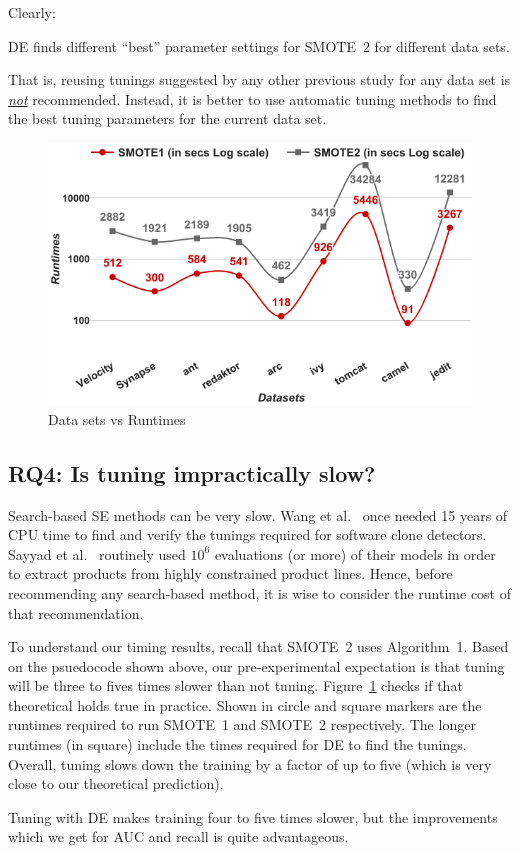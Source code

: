 Clearly:
\begin{lesson1}
    DE finds different ``best'' parameter settings for SMOTE~2 for different data sets.
\end{lesson1}
 That is,  reusing tunings  suggested  by  any other  previous study  for any data set is \underline{{\em not}} recommended. Instead,  it is better to
      use  automatic  tuning  methods  to find the best tuning parameters for the current data set.
      

\begin{figure}[!t]
  \captionsetup{justification=centering}
  \includegraphics[width=\linewidth]{./fig/runtimes.png}
  \caption{Data sets vs Runtimes}
  \label{runtime}
\end{figure} 

\subsection{\textbf{RQ4: Is tuning impractically slow?}}

Search-based SE methods can be very slow. Wang et al.~\cite{wang2013searching} once needed 15
years of CPU time to find and verify the tunings required for software
clone detectors. Sayyad et al.~\cite{sayyad2013scalable} routinely used
$10^6$ evaluations (or more) of their models in order to extract
products from highly constrained product
lines. Hence, before recommending any
search-based method, it is wise to consider the runtime cost of that
recommendation.

To understand our timing results, recall that SMOTE~2 uses
Algorithm~1. Based on the psuedocode
shown above, our pre-experimental expectation is that
tuning will be three to fives times slower than not tuning.  
Figure~\ref{runtime} checks if that theoretical
holds true in practice. Shown in circle and square markers are the
  runtimes required to run SMOTE~1 and SMOTE~2 respectively.  The
  longer runtimes (in square) include the times required for DE to find
  the tunings. Overall, tuning slows down the training by a factor of up to
  five (which is very close to our theoretical prediction).

\begin{lesson1}
    Tuning with DE makes training four to five times slower, but the improvements which we get for AUC and recall is quite advantageous.
\end{lesson1}

